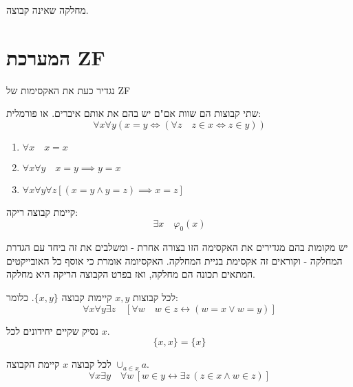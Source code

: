 \documentclass{tstextbook}
\begin{document}
\begin{definition}
מחלקה שאינה קבוצה.

\end{definition}
\section{המערכת ZF}

נגדיר כעת את האקסימות של ZF

\begin{definition}
שתי קבוצות הם שוות אם"ם יש בהם את אותם איברים. או פורמלית:
$$\forall x\forall y\left( x = y \iff \left( \forall z\quad z \in x \iff z \in y \right) \right)$$

\end{definition}
\begin{corollary}
  \begin{enumerate}
    \item \(\forall x\quad x = x\)


    \item \(\forall x \forall y\quad x=y\implies y = x\)


    \item \(\forall x\forall y\forall z \left[ \left( x=y\land y=z \right)\implies x=z \right]\)


  \end{enumerate}
\end{corollary}
\begin{definition}
קיימת קבוצה ריקה:
$$\exists x\quad \varphi_{0}(x)$$

\end{definition}
\begin{remark}
יש מקומות בהם מגדירים את האקסימה הזו בצורה אחרת - ומשלבים את זה ביחד עם הגדרת המחלקה - וקוראים זה אקסימת בניית המחלקה. האקסיומה אומרת כי אוסף כל האובייקטים המתאים תכונה הם מחלקה, ואז בפרט הקבוצה הריקה היא מחלקה.

\end{remark}
\begin{definition}
לכל קבוצות \(x,y\) קיימות קבוצה \(\{ x,y \}\). כלומר:
$$\forall x\forall y\exists z\quad[\forall w\quad w\in z\leftrightarrow(w=x\lor w=y)]$$

\end{definition}
\begin{remark}
נסיק שקיים יחידונים לכל \(x\).
$$\{ x,x \}=\{ x \}$$

\end{remark}
\begin{definition}
לכל קבוצה \(x\) קיימת הקבוצה \(\displaystyle{\cup_{a \in x}a}\).
$$\forall x\exists y\quad\forall w\,[w\in y\leftrightarrow\exists z\,(z\in x\land w\in z)]$$

\end{definition}
\end{document}
